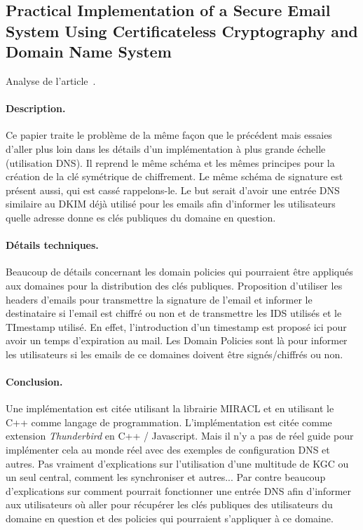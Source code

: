 \subsection{Practical Implementation of a Secure Email System Using Certificateless Cryptography and Domain Name System}
Analyse de l'article~\cite{DBLP:journals/ijnsec/BalakrishnanR16}.
\paragraph*{Description.} Ce papier traite le problème de la même façon que le précédent mais essaies d'aller plus loin dans les détails d'un implémentation à plus grande échelle (utilisation DNS). Il reprend le même schéma et les mêmes principes pour la création de la clé symétrique de chiffrement. Le même schéma de signature est présent aussi, qui est cassé rappelons-le. Le but serait d'avoir une entrée DNS similaire au DKIM déjà utilisé pour les emails afin d'informer les utilisateurs quelle adresse donne es clés publiques du domaine en question.
\paragraph*{Détails techniques.} Beaucoup de détails concernant les domain policies qui pourraient être appliqués aux domaines pour la distribution des clés publiques. Proposition d'utiliser les headers d'emails pour transmettre la signature de l'email et informer le destinataire si l'email est chiffré ou non et de transmettre les IDS utilisés et le TImestamp utilisé. En effet, l'introduction d'un timestamp est proposé ici pour avoir un temps d'expiration au mail. Les Domain Policies sont là pour informer les utilisateurs si les emails de ce domaines doivent être signés/chiffrés ou non.
\paragraph*{Conclusion.} Une implémentation est citée utilisant la librairie MIRACL et en utilisant le C++ comme langage de programmation. L'implémentation est citée comme extension \textit{Thunderbird} en C++ / Javascript. Mais il n'y a pas de réel guide pour implémenter cela au monde réel avec des exemples de configuration DNS et autres. Pas vraiment d'explications sur l'utilisation d'une multitude de KGC ou un seul central, comment les synchroniser et autres... Par contre beaucoup d'explications sur comment pourrait fonctionner une entrée DNS afin d'informer aux utilisateurs où aller pour récupérer les clés publiques des utilisateurs du domaine en question et des policies qui pourraient s'appliquer à ce domaine.
